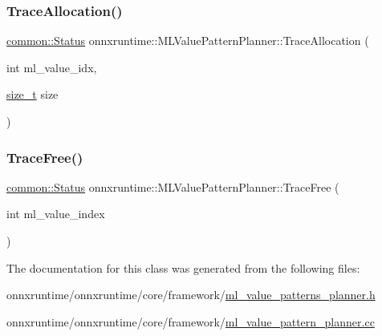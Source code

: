 \subsubsection{\texorpdfstring{Trace\+Allocation()}{TraceAllocation()}}
{\footnotesize\ttfamily \mbox{\hyperlink{classonnxruntime_1_1common_1_1Status}{common\+::\+Status}} onnxruntime\+::\+M\+L\+Value\+Pattern\+Planner\+::\+Trace\+Allocation (\begin{DoxyParamCaption}\item[{int}]{ml\+\_\+value\+\_\+idx,  }\item[{\mbox{\hyperlink{mlasi_8h_a503efbc1c6e50825320ad909366b78ab}{size\+\_\+t}}}]{size }\end{DoxyParamCaption})\hspace{0.3cm}{\ttfamily [inline]}}

\mbox{\label{classonnxruntime_1_1MLValuePatternPlanner_ac7ead95fa51ba48e2b1921363b29d235}} 
\subsubsection{\texorpdfstring{Trace\+Free()}{TraceFree()}}
{\footnotesize\ttfamily \mbox{\hyperlink{classonnxruntime_1_1common_1_1Status}{common\+::\+Status}} onnxruntime\+::\+M\+L\+Value\+Pattern\+Planner\+::\+Trace\+Free (\begin{DoxyParamCaption}\item[{int}]{ml\+\_\+value\+\_\+index }\end{DoxyParamCaption})\hspace{0.3cm}{\ttfamily [inline]}}



The documentation for this class was generated from the following files\+:\begin{DoxyCompactItemize}
\item 
onnxruntime/onnxruntime/core/framework/\mbox{\hyperlink{ml__value__patterns__planner_8h}{ml\+\_\+value\+\_\+patterns\+\_\+planner.\+h}}\item 
onnxruntime/onnxruntime/core/framework/\mbox{\hyperlink{ml__value__pattern__planner_8cc}{ml\+\_\+value\+\_\+pattern\+\_\+planner.\+cc}}\end{DoxyCompactItemize}
